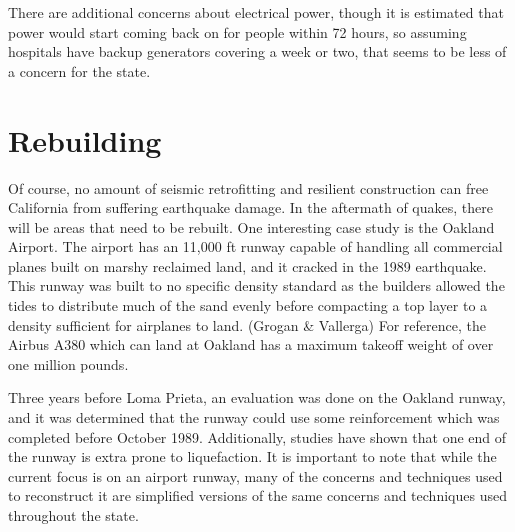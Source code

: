 \documentclass[12pt]{article}
\begin{document}
There are additional concerns about electrical power, though it is estimated that power would start coming back on for people within 72 hours, so assuming hospitals have backup generators covering a week or two, that seems to be less of a concern for the state.  

\section*{Rebuilding}

Of course, no amount of seismic retrofitting and resilient construction can free California from suffering earthquake damage.  In the aftermath of quakes, there will be areas that need to be rebuilt.  One interesting case study is the Oakland Airport.  The airport has an 11,000 ft runway capable of handling all commercial planes built on marshy reclaimed land, and it cracked in the 1989 earthquake.  This runway was built to no specific density standard as the builders allowed the tides to distribute much of the sand evenly before compacting a top layer to a density sufficient for airplanes to land.  (Grogan \& Vallerga)  For reference, the Airbus A380 which can land at Oakland has a maximum takeoff weight of over one million pounds.

Three years before Loma Prieta, an evaluation was done on the Oakland runway, and it was determined that the runway could use some reinforcement which was completed before October 1989.  Additionally, studies have shown that one end of the runway is extra prone to liquefaction.  It is important to note that while the current focus is on an airport runway, many of the concerns and techniques used to reconstruct it are simplified versions of the same concerns and techniques used throughout the state.
\end{document}
